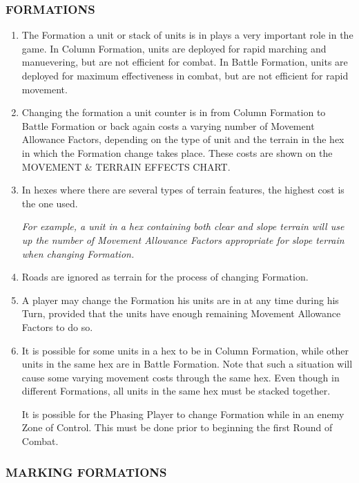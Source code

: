 \subsubsection{FORMATIONS}

\begin{enumerate}
  \item The Formation a unit or stack of units is in plays a very important role in the game. In Column Formation, units are deployed for rapid marching and manuevering, but are not efficient for combat. In Battle Formation, units are deployed for maximum effectiveness in combat, but are not efficient for rapid movement.

  \item Changing the formation a unit counter is in from Column Formation to Battle Formation or back again costs a varying number of Movement Allowance Factors, depending on the type of unit and the terrain in the hex in which the Formation change takes place. These costs are shown on the MOVEMENT \& TERRAIN EFFECTS CHART.

  \item In hexes where there are several types of terrain features, the highest cost is the one used.

  \textit{For example, a unit in a hex containing both clear and slope terrain will use up the number of Movement Allowance Factors appropriate for slope terrain when changing Formation.}

  \item Roads are ignored as terrain for the process of changing Formation.

  \item A player may change the Formation his units are in at any time during his Turn, provided that the units have enough remaining Movement Allowance Factors to do so.

  \item It is possible for some units in a hex to be in Column Formation, while other units in the same hex are in Battle Formation. Note that such a situation will cause some varying movement costs through the same hex. Even though in different Formations, all units in the same hex must be stacked together.

  It is possible for the Phasing Player to change Formation while in an enemy Zone of Control. This must be done prior to beginning the first Round of Combat.
\end{enumerate}

\subsubsection{MARKING FORMATIONS}

